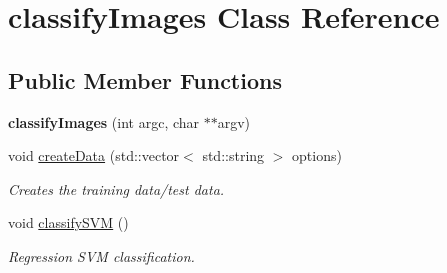 \hypertarget{classclassifyImages}{
\section{classifyImages Class Reference}
\label{classclassifyImages}
}
\subsection*{Public Member Functions}
\begin{DoxyCompactItemize}
\item 
\hypertarget{classclassifyImages_a2ced301ff23a5c73c73d71bb0aa28d14}{
{\bfseries classifyImages} (int argc, char $\ast$$\ast$argv)}
\label{classclassifyImages_a2ced301ff23a5c73c73d71bb0aa28d14}

\item 
\hypertarget{classclassifyImages_a406fd42b8a6c482cfdf7a9ad9dbe9122}{
void \hyperlink{classclassifyImages_a406fd42b8a6c482cfdf7a9ad9dbe9122}{createData} (std::vector$<$ std::string $>$ options)}
\label{classclassifyImages_a406fd42b8a6c482cfdf7a9ad9dbe9122}

\begin{DoxyCompactList}\small\item\em Creates the training data/test data. \item\end{DoxyCompactList}\item 
\hypertarget{classclassifyImages_a9a5c705866ce77cb4a4a24bda7396c85}{
void \hyperlink{classclassifyImages_a9a5c705866ce77cb4a4a24bda7396c85}{classifySVM} ()}
\label{classclassifyImages_a9a5c705866ce77cb4a4a24bda7396c85}

\begin{DoxyCompactList}\small\item\em Regression SVM classification. \item\end{DoxyCompactList}\end{DoxyCompactItemize}
